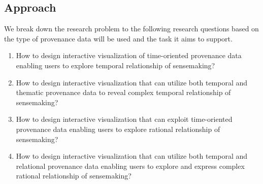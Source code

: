 %

\subsection{Approach}

We break down the research problem to the following research questions based on the type of provenance data will be used and the task it aims to support.

\begin{enumerate}
	\item How to design interactive visualization of time-oriented provenance data enabling users to explore temporal relationship of sensemaking?
	
	\item How to design interactive visualization that can utilize both temporal and thematic provenance data to reveal complex temporal relationship of sensemaking?	
	
	\item How to design interactive visualization that can exploit time-oriented provenance data enabling users to explore rational relationship of sensemaking?
	
	\item How to design interactive visualization that can utilize both temporal and relational provenance data enabling users to explore and express complex rational relationship of sensemaking?				
\end{enumerate}

